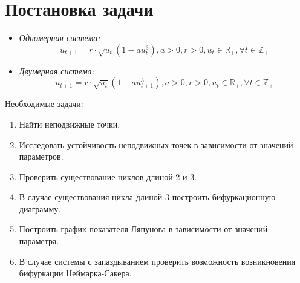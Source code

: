 \documentclass[11pt]{article}
\begin{document}
\section{Постановка задачи}
	\begin{itemize}
	\item {\it Одномерная система:}
	\begin{equation} \label{system_1}
	u_{t+1} =  r \cdot \sqrt{u_t} (1 - a u_t^3), a > 0, r > 0, u_t \in \mathbb{R}_+, \forall t \in \mathbb{Z}_+
	\end{equation}
	\item {\it Двумерная система:}
	\begin{equation} \label{system_2}
	u_{t+1} = r \cdot \sqrt{u_t} (1 - a u_{t+1}^3), a > 0, r > 0, u_t \in \mathbb{R}_+, \forall t \in \mathbb{Z}_+
	\end{equation}
	\end{itemize}
	Необходимые задачи:
\begin{enumerate}
    \item Найти неподвижные точки.
    \item Исследовать устойчивость неподвижных точек в зависимости от значений параметров.
    \item Проверить существование циклов длиной 2 и 3.
    \item В случае существования цикла длиной 3 построить бифуркационную диаграмму.
    \item Построить график показателя Ляпунова в зависимости от значений параметра.
    \item В случае системы с запаздыванием проверить возможность возникновения бифуркации Неймарка-Сакера. 
\end{enumerate}
\newpage
\end{document}
